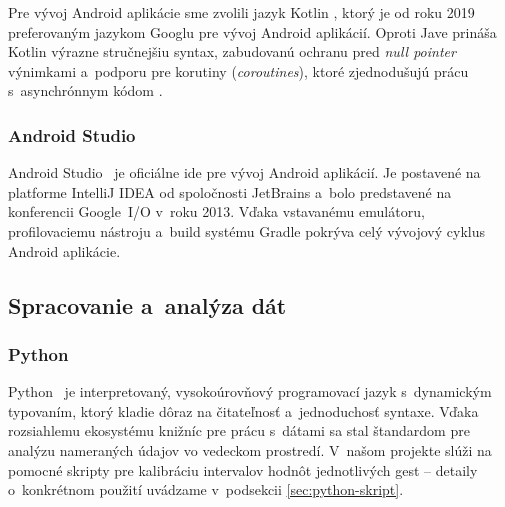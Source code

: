 Pre vývoj Android aplikácie sme zvolili jazyk
Kotlin \cite{kotlin_android}, ktorý je od roku 2019 preferovaným jazykom
Googlu pre vývoj Android aplikácií. Oproti Jave prináša Kotlin
výrazne stručnejšiu syntax, zabudovanú ochranu
pred \textit{null pointer} výnimkami a~podporu pre
korutiny (\textit{coroutines}), ktoré zjednodušujú
prácu s~asynchrónnym kódom \cite{kotlin_overview}.

\subsubsection{Android Studio}

Android Studio~\cite{android_studio_intro} je oficiálne \Gls{ide} pre vývoj 
Android aplikácií. Je postavené na platforme IntelliJ IDEA od
spoločnosti JetBrains a~bolo predstavené na
konferencii Google~I/O v~roku 2013. Vďaka vstavanému
emulátoru, profilovaciemu nástroju a~build systému
Gradle pokrýva celý vývojový cyklus Android
aplikácie.

\subsection{Spracovanie a~analýza dát}
\label{subsec:python-tech}

\subsubsection{Python}

Python~\cite{python-definition} je interpretovaný, vysokoúrovňový programovací
jazyk s~dynamickým typovaním, ktorý kladie dôraz
na čitateľnosť a~jednoduchosť syntaxe. Vďaka rozsiahlemu
ekosystému knižníc pre prácu s~dátami sa stal
štandardom pre analýzu nameraných údajov vo
vedeckom prostredí. V~našom projekte slúži na
pomocné skripty pre kalibráciu intervalov hodnôt
jednotlivých gest -- detaily o~konkrétnom
použití uvádzame v~podsekcii
\ref{sec:python-skript}.